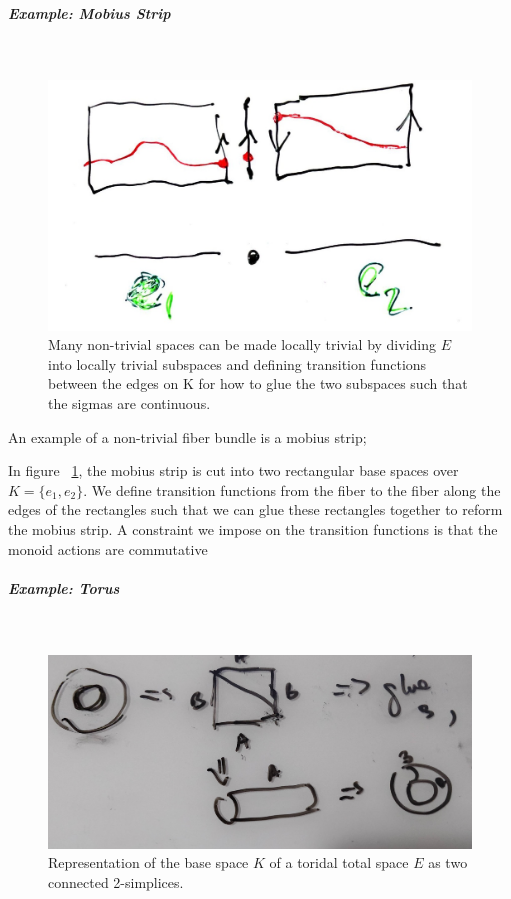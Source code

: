 \documentclass[../main.tex]{subfiles}
\begin{document}
\subparagraph{Example: Mobius Strip}\mbox{}\\
\begin{figure}[H]
    \label{fig:data_base_transition}
    \includegraphics[width=\textwidth]{figures/math/transition_functions.png}
    \caption{Many non-trivial spaces can be made locally trivial by dividing $E$ into locally trivial subspaces and defining transition functions between the edges on K for how to glue the two subspaces such that the sigmas are continuous.}
\end{figure}

 An example of a non-trivial fiber bundle is a mobius strip\cite{find the citation for why};

In figure ~\ref{fig:data_base_transition}, the mobius strip is cut into two rectangular base spaces over $K=\{e_1, e_2\}$. We define transition functions from the fiber to the fiber along the edges of the rectangles such that we can glue these rectangles together to reform the mobius strip. A constraint we impose on the transition functions is that the monoid actions are commutative

\subparagraph{Example: Torus}\mbox{}\\
\begin{figure}[H]
    \label{fig:triangle_torus}
    \includegraphics[width=\textwidth]{figures/math/triangle_torus.png}
    \caption{Representation of the base space $K$ of a toridal total space $E$ as two connected 2-simplices.}
\end{figure}
\end{document}
